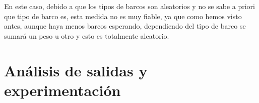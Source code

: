 \documentclass[12pt, spanish]{article}
\begin{document}
En este caso, debido a que los tipos de barcos son aleatorios y no se sabe a priori que tipo de barco es, esta medida no es muy fiable, ya que como hemos visto antes, aunque haya menos barcos esperando, dependiendo del tipo de barco se sumará un peso u otro y esto es totalmente aleatorio.

\section{Análisis de salidas y experimentación}

%
%
\end{document}
